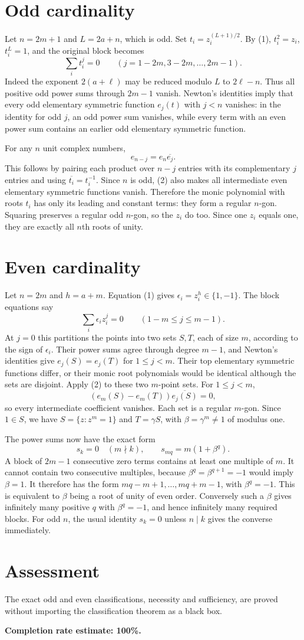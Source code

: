 \documentclass[11pt]{article}
\begin{document}
\section*{Odd cardinality}
Let $n=2m+1$ and $L=2a+n$, which is odd. Set $t_i=z_i^{(L+1)/2}$. By (1), $t_i^2=z_i$, $t_i^L=1$, and the original block becomes
\[
 \sum_i t_i^j=0\qquad(j=1-2m,3-2m,\ldots,2m-1).
\]
Indeed the exponent $2(a+\ell)$ may be reduced modulo $L$ to $2\ell-n$. Thus all positive odd power sums through $2m-1$ vanish. Newton's identities imply that every odd elementary symmetric function $e_j(t)$ with $j<n$ vanishes: in the identity for odd $j$, an odd power sum vanishes, while every term with an even power sum contains an earlier odd elementary symmetric function.

For any $n$ unit complex numbers,
\[
 e_{n-j}=e_n\overline{e_j}. \tag{2}
\]
This follows by pairing each product over $n-j$ entries with its complementary $j$ entries and using $\overline{t_i}=t_i^{-1}$. Since $n$ is odd, (2) also makes all intermediate even elementary symmetric functions vanish. Therefore the monic polynomial with roots $t_i$ has only its leading and constant terms: they form a regular $n$-gon. Squaring preserves a regular odd $n$-gon, so the $z_i$ do too. Since one $z_i$ equals one, they are exactly all $n$th roots of unity.

\section*{Even cardinality}
Let $n=2m$ and $h=a+m$. Equation (1) gives $\epsilon_i=z_i^h\in\{1,-1\}$. The block equations say
\[
 \sum_i\epsilon_i z_i^j=0\qquad(1-m\le j\le m-1).
\]
At $j=0$ this partitions the points into two sets $S,T$, each of size $m$, according to the sign of $\epsilon_i$. Their power sums agree through degree $m-1$, and Newton's identities give $e_j(S)=e_j(T)$ for $1\le j<m$. Their top elementary symmetric functions differ, or their monic root polynomials would be identical although the sets are disjoint. Apply (2) to these two $m$-point sets. For $1\le j<m$,
\[
 (e_m(S)-e_m(T))\overline{e_j(S)}=0,
\]
so every intermediate coefficient vanishes. Each set is a regular $m$-gon. Since $1\in S$, we have $S=\{z:z^m=1\}$ and $T=\gamma S$, with $\beta=\gamma^m\ne1$ of modulus one.

The power sums now have the exact form
\[
 s_k=0\quad(m\nmid k),\qquad s_{mq}=m(1+\beta^q).
\]
A block of $2m-1$ consecutive zero terms contains at least one multiple of $m$. It cannot contain two consecutive multiples, because $\beta^q=\beta^{q+1}=-1$ would imply $\beta=1$. It therefore has the form $mq-m+1,\ldots,mq+m-1$, with $\beta^q=-1$. This is equivalent to $\beta$ being a root of unity of even order. Conversely such a $\beta$ gives infinitely many positive $q$ with $\beta^q=-1$, and hence infinitely many required blocks. For odd $n$, the usual identity $s_k=0$ unless $n\mid k$ gives the converse immediately.

\section*{Assessment}
The exact odd and even classifications, necessity and sufficiency, are proved without importing the classification theorem as a black box.

\textbf{Completion rate estimate: 100\%.}
\end{document}
